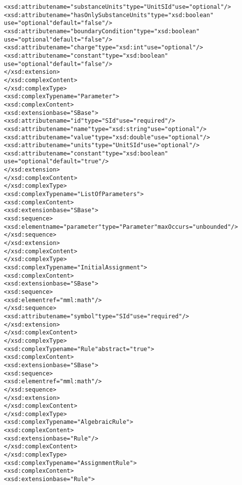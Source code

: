 \begin{alltt}
                <xsd:attribute name="substanceUnits" type="UnitSId" use="optional"/>
                <xsd:attribute name="hasOnlySubstanceUnits" type="xsd:boolean" 
                               use="optional" default="false"/>
                <xsd:attribute name="boundaryCondition" type="xsd:boolean" 
                               use="optional" default="false"/>
                <xsd:attribute name="charge" type="xsd:int" use="optional"/>
                <xsd:attribute name="constant" type="xsd:boolean" 
                               use="optional" default="false"/>
            </xsd:extension>
        </xsd:complexContent>
    </xsd:complexType>
    <xsd:complexType name="Parameter">
        <xsd:complexContent>
            <xsd:extension base="SBase">
                <xsd:attribute name="id" type="SId" use="required"/>
                <xsd:attribute name="name" type="xsd:string" use="optional"/>
                <xsd:attribute name="value" type="xsd:double" use="optional"/>
                <xsd:attribute name="units" type="UnitSId" use="optional"/>
                <xsd:attribute name="constant" type="xsd:boolean" 
                               use="optional" default="true"/>
            </xsd:extension>
        </xsd:complexContent>
    </xsd:complexType>
    <xsd:complexType name="ListOfParameters">
        <xsd:complexContent>
            <xsd:extension base="SBase">
                <xsd:sequence>
                    <xsd:element name="parameter" type="Parameter" maxOccurs="unbounded"/>
                </xsd:sequence>
            </xsd:extension>
        </xsd:complexContent>
    </xsd:complexType>
    <xsd:complexType name="InitialAssignment">
        <xsd:complexContent>
            <xsd:extension base="SBase">
                <xsd:sequence>
                    <xsd:element ref="mml:math"/>
                </xsd:sequence>
                <xsd:attribute name="symbol" type="SId" use="required"/>
            </xsd:extension>
        </xsd:complexContent>
    </xsd:complexType>
    <xsd:complexType name="Rule" abstract="true">
        <xsd:complexContent>
            <xsd:extension base="SBase">
                <xsd:sequence>
                    <xsd:element ref="mml:math"/>
                </xsd:sequence>
            </xsd:extension>
        </xsd:complexContent>
    </xsd:complexType>
    <xsd:complexType name="AlgebraicRule">
        <xsd:complexContent>
            <xsd:extension base="Rule"/>
        </xsd:complexContent>
    </xsd:complexType>
    <xsd:complexType name="AssignmentRule">
        <xsd:complexContent>
            <xsd:extension base="Rule">

\end{alltt}
